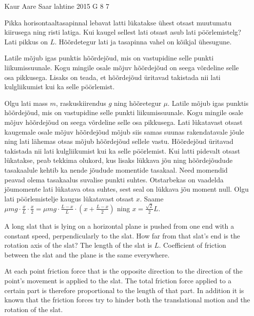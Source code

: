 {Kaur Aare Saar} %
{lahtine} %
{2015} %
{G 8} %
{7} %
{
\ifStatement
Pikka horisontaaltasapinnal lebavat latti lükatakse ühest otsast muutumatu kiirusega ning risti latiga. Kui kaugel sellest lati otsast asub lati pöörlemistelg? Lati pikkus on $L$. Hõõrdetegur lati ja tasapinna vahel on kõikjal ühesugune.
\fi


\ifHint
Latile mõjub igas punktis hõõrdejõud, mis on vastupidine selle punkti liikumissuunale. Kogu mingile osale mõjuv hõõrdejõud on seega võrdeline selle osa pikkusega. Lisaks on teada, et hõõrdejõud üritavad takistada nii lati kulgliikumist kui ka selle pöörlemist.
\fi


\ifSolution
Olgu lati mass $m$, raskuskiirendus $g$ ning hõõretegur $\mu$. Latile mõjub igas punktis hõõrdejõud, mis on vastupidine selle punkti liikumissuunale. Kogu mingile osale mõjuv hõõrdejõud on seega võrdeline selle osa pikkusega. Lati lükatavast otsast kaugemale osale mõjuv hõõrdejõud mõjub siis samas suunas rakendatavale jõule ning lati lähemas otsas mõjub hõõrdejõud sellele vastu. Hõõrdejõud üritavad takistada nii lati kulgliikumist kui ka selle pöörlemist. Kui latti pidevalt otsast lükatakse, peab tekkima olukord, kus lisaks lükkava jõu ning hõõrdejõudude tasakaalule kehtib ka nende jõudude momentide tasakaal. Need momendid peavad olema tasakaalus suvalise punkti suhtes. Otstarbekas on vaadelda jõumomente lati lükatava otsa suhtes, sest seal on lükkava jõu moment null. Olgu lati pöörlemistelje kaugus lükatavast otsast $x$. Saame $\mu mg \cdot \frac{x}{L} \cdot \frac{x}{2}=\mu mg \cdot \frac{L-x}{L} \cdot \left(x+\frac{L-x}{2}\right)$ ning $x=\frac{\sqrt{2}}{2}L$.
\fi


\ifEngStatement
A long slat that is lying on a horizontal plane is pushed from one end with a constant speed, perpendicularly to the slat. How far from that slat’s end is the rotation axis of the slat? The length of the slat is $L$. Coefficient of friction between the slat and the plane is the same everywhere.
\fi


\ifEngHint
At each point friction force that is the opposite direction to the direction of the point’s movement is applied to the slat. The total friction force applied to a certain part is therefore proportional to the length of that part. In addition it is known that the friction forces try to hinder both the translational motion and the rotation of the slat.
\fi


}

